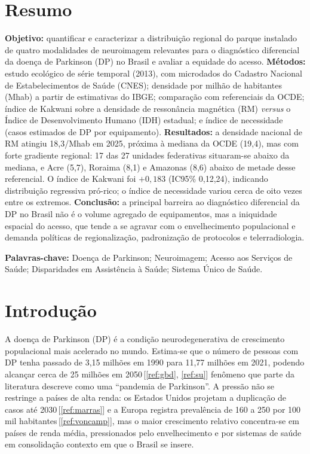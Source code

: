 \documentclass[12pt,a4paper,oneside]{article}
\begin{document}
\section*{Resumo}
\begin{singlespace}\small\noindent
\textbf{Objetivo:} quantificar e caracterizar a distribuição regional
do parque instalado de quatro modalidades de neuroimagem relevantes
para o diagnóstico diferencial da doença de Parkinson (DP) no Brasil e
avaliar a equidade do acesso. \textbf{Métodos:} estudo ecológico de
série temporal (2013), com microdados do Cadastro
Nacional de Estabelecimentos de Saúde (CNES); densidade por milhão de
habitantes (Mhab) a partir de estimativas do IBGE; comparação com
referenciais da OCDE; índice de Kakwani sobre a densidade de
ressonância magnética (RM) \textit{versus} o Índice de Desenvolvimento
Humano (IDH) estadual; e índice de necessidade (casos estimados de DP
por equipamento). \textbf{Resultados:} a densidade nacional de RM
atingiu 18,3/Mhab em 2025, próxima à mediana da OCDE (19,4), mas com
forte gradiente regional: 17 das 27 unidades federativas situaram-se
abaixo da mediana, e Acre (5,7), Roraima (8,1) e Amazonas (8,6) abaixo
de metade desse referencial. O índice de Kakwani foi $+0{,}183$
(IC95\% 0,12,24), indicando distribuição regressiva
pró-rico; o índice de necessidade variou cerca de oito vezes entre os
extremos. \textbf{Conclusão:} a principal barreira ao diagnóstico
diferencial da DP no Brasil não é o volume agregado de equipamentos,
mas a iniquidade espacial do acesso, que tende a se agravar com o
envelhecimento populacional e demanda políticas de regionalização,
padronização de protocolos e telerradiologia.

\vspace{0.35cm}\noindent\textbf{Palavras-chave:} Doença de Parkinson;
Neuroimagem; Acesso aos Serviços de Saúde; Disparidades em Assistência
à Saúde; Sistema Único de Saúde.
\end{singlespace}

\newpage

\section{Introdução}

A doença de Parkinson (DP) é a condição neurodegenerativa de
crescimento populacional mais acelerado no mundo. Estima-se que o
número de pessoas com DP tenha passado de 3,15 milhões em 1990 para
11,77 milhões em 2021, podendo alcançar cerca de 25 milhões em
2050\,[\ref{ref:gbd}, \ref{ref:su}] \textemdash{} fenômeno que parte
da literatura descreve como uma ``pandemia de Parkinson''. A pressão
não se restringe a países de alta renda: os Estados Unidos projetam a
duplicação de casos até 2030\,[\ref{ref:marras}] e a Europa registra
prevalência de 160 a 250 por 100 mil habitantes\,[\ref{ref:voncamp}],
mas o maior crescimento relativo concentra-se em países de renda
média, pressionados pelo envelhecimento e por sistemas de saúde em
consolidação \textemdash{} contexto em que o Brasil se insere.
\end{document}
